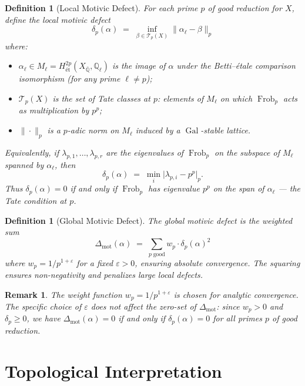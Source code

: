 \documentclass[11pt]{article}
\newtheorem{definition}[theorem]{Definition}
\newtheorem{remark}[theorem]{Remark}
\theoremstyle{definition}
\DeclareMathOperator{\Gal}{Gal}
\DeclareMathOperator{\Frob}{Frob}
\begin{document}
\begin{definition}[Local Motivic Defect]
\label{def:local-defect}
For each prime $p$ of good reduction for $X$, define the \emph{local motivic
defect}
\[
  \delta_p(\alpha)
  \;=\;
  \inf_{\beta \in \mathcal{T}_p(X)}
  \bigl\| \alpha_\ell - \beta \bigr\|_p
\]
where:
\begin{itemize}
  \item $\alpha_\ell \in M_\ell = H^{2p}_{\text{\'et}}(X_{\bar{\mathbb{Q}}}, \mathbb{Q}_\ell)$
    is the image of $\alpha$ under the Betti--\'etale comparison isomorphism
    (for any prime $\ell \neq p$);
  \item $\mathcal{T}_p(X)$ is the set of \emph{Tate classes} at $p$: elements
    of $M_\ell$ on which $\Frob_p$ acts as multiplication by $p^p$;
  \item $\|\cdot\|_p$ is a $p$-adic norm on $M_\ell$ induced by a
    $\Gal$-stable lattice.
\end{itemize}
Equivalently, if $\lambda_{p,1}, \ldots, \lambda_{p,r}$ are the eigenvalues
of $\Frob_p$ on the subspace of $M_\ell$ spanned by $\alpha_\ell$, then
\[
  \delta_p(\alpha) \;=\; \min_i \bigl|\lambda_{p,i} - p^p\bigr|_p.
\]
Thus $\delta_p(\alpha) = 0$ if and only if $\Frob_p$ has eigenvalue $p^p$ on the
span of $\alpha_\ell$ --- the Tate condition at $p$.
\end{definition}

\begin{definition}[Global Motivic Defect]
\label{def:global-defect}
The \emph{global motivic defect} is the weighted sum
\[
  \Delta_{\mathrm{mot}}(\alpha)
  \;=\;
  \sum_{p \;\text{good}} w_p \cdot \delta_p(\alpha)^2
\]
where $w_p = 1/p^{1+\varepsilon}$ for a fixed $\varepsilon > 0$, ensuring
absolute convergence.  The squaring ensures non-negativity and penalizes
large local defects.
\end{definition}

\begin{remark}
The weight function $w_p = 1/p^{1+\varepsilon}$ is chosen for analytic
convergence.  The specific choice of $\varepsilon$ does not affect the
zero-set of $\Delta_{\mathrm{mot}}$: since $w_p > 0$ and $\delta_p \geq 0$,
we have $\Delta_{\mathrm{mot}}(\alpha) = 0$ if and only if $\delta_p(\alpha) = 0$
for all primes $p$ of good reduction.
\end{remark}

\section{Topological Interpretation}
\label{sec:topology}
\end{document}
